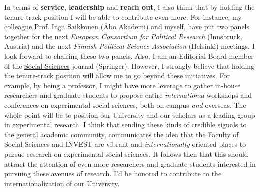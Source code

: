 \documentclass[10pt,stdletter,dateno,sigleft]{newlfm} %
\begin{document}
\begin{newlfm}
In terms of {\bf service}, {\bf leadership} and {\bf reach out}, I also think that by holding the tenure-track position I will be able to contribute even more. For instance, my colleague \href{https://research.abo.fi/en/persons/inga-saikkonen}{Prof. Inga Saikkonen} (\AA bo Akademi) and myself, have put two panels together for the next \emph{European Consortium for Political Research} (Innsbruck, Austria) and the next \emph{Finnish Political Science Association} (Helsinki) meetings. I look forward to chairing these two panels. Also, I am an Editorial Board member of the \href{https://www.springer.com/journal/43545}{Social Sciences} journal (Springer). However, I strongly believe that holding the tenure-track position will allow me to go beyond these initiatives. For example, by being a professor, I might have more leverage to gather in-house researchers and graduate students to propose entire \emph{international} workshops and conferences on experimental social sciences, both on-campus \emph{and} overseas. The whole point will be to position our University and our scholars as a leading group in experimental research. I think that sending these kinds of credible signals to the general academic community, communicates the idea that the Faculty of Social Sciences and INVEST are vibrant and \emph{internationally}-oriented places to pursue research on experimental social sciences. It follows then that this should attract the attention of even more researchers and graduate students interested in pursuing these avenues of research. I'd be honored to contribute to the internationalization of our University.


\end{newlfm}
\end{document}
